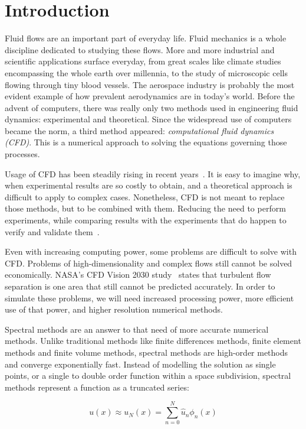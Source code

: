 \chapter{Introduction}
Fluid flows are an important part of everyday life. Fluid mechanics is a whole discipline dedicated
to studying these flows. More and more industrial and scientific applications surface everyday, from
great scales like climate studies encompassing the whole earth over millennia, to the study of
microscopic cells flowing through tiny blood vessels. The aerospace industry is probably the most
evident example of how prevalent aerodynamics are in today's world. Before the advent of computers,
there was really only two methods used in engineering fluid dynamics: experimental and theoretical.
Since the widespread use of computers became the norm, a third method appeared:
\textit{computational fluid dynamics (CFD)}. This is a numerical approach to solving the equations
governing those processes.

Usage of CFD has been steadily rising in recent years~\cite{Slotnick2014}. It is easy to imagine
why, when experimental results are so costly to obtain, and a theoretical approach is difficult to
apply to complex cases. Nonetheless, CFD is not meant to replace those methods, but to be combined
with them. Reducing the need to perform experiments, while comparing results with the experiments
that do happen to verify and validate them~\cite{Stern2001}.

Even with increasing computing power, some problems are difficult to solve with CFD. Problems of
high-dimensionality and complex flows still cannot be solved economically. NASA's CFD Vision 2030
study~\cite{Slotnick2014} states that turbulent flow separation is one area that still cannot be
predicted accurately. In order to simulate these problems, we will need increased processing power,
more efficient use of that power, and higher resolution numerical methods.

Spectral methods are an answer to that need of more accurate numerical methods. Unlike traditional
methods like finite differences methods, finite element methods and finite volume methods, spectral
methods are high-order methods and converge exponentially fast. Instead of modelling the solution as
single points, or a single to double order function within a space subdivision, spectral methods
represent a function as a truncated series:

\begin{equation}
	u(x) \approx u_N(x) = \sum_{n = 0}^{N}\widehat{u}_n\phi _n(x)
\end{equation}